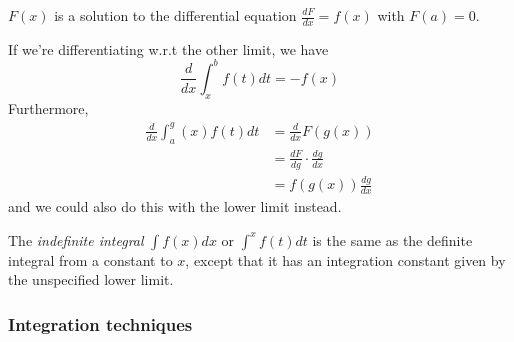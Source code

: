 \documentclass{../template/note}
\begin{document}
    \begin{remark*}
        \(F(x)\) is a solution to the differential equation \(\frac{dF}{dx} = f(x)\) with \(F(a) = 0\).
    \end{remark*}

    \begin{corollary}
        If we're differentiating w.r.t the other limit, we have
        \[
            \frac{d}{dx} \int_x^b f(t) dt = -f(x)
        \]
        Furthermore, 
        \begin{align*}
            \frac{d}{dx} \int_a^g(x) f(t) dt &= \frac{d}{dx} F(g(x)) \\
            &= \frac{dF}{dg} \cdot \frac{dg}{dx} \\
            &= f(g(x)) \frac{dg}{dx}
        \end{align*}
        and we could also do this with the lower limit instead.
    \end{corollary}
    
    \begin{definition}
        The \emph{indefinite integral} \(\int f(x) dx\) or \(\int^x f(t) dt\) is the same as the definite integral from a constant to \(x\), except that it has an integration constant given by the unspecified lower limit.
    \end{definition}
    
    \subsubsection{Integration techniques}
\end{document}
